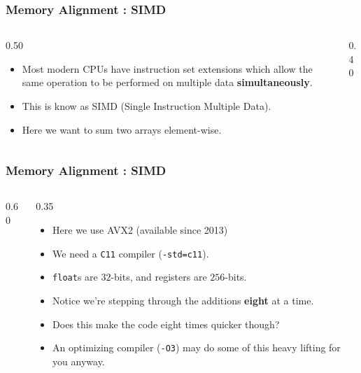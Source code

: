 
\begin{frame}[fragile]
\frametitle{Memory Alignment : SIMD}
\begin{columns}[T]


\pause
\begin{column}{0.50\textwidth}
\begin{itemize}[<+->]
\item Most modern CPUs have instruction set extensions which allow the same operation to be performed on multiple data {\bf simultaneously}.
\item This is know as SIMD (Single Instruction Multiple Data).
\item Here we want to sum two arrays element-wise.
\end{itemize}
\end{column}

\pause
\begin{column}{0.40\textwidth}

\end{column}

\end{columns}
\end{frame}


\begin{frame}[fragile]
\frametitle{Memory Alignment : SIMD}
\begin{columns}[T]

\begin{column}{0.60\textwidth}

\end{column}

\pause
\begin{column}{0.35\textwidth}
\begin{itemize}[<+->]
\item Here we use AVX2 (available since 2013)
\item We need a \verb^C11^ compiler (\verb^-std=c11^).
\item \verb^float^s are $32$-bits, and registers are $256$-bits.
\item Notice we're stepping through the additions {\bf eight} at a time.
\item Does this make the code eight times quicker though?
\item An optimizing compiler (\verb^-O3^) may do some of this heavy lifting for you anyway.
\end{itemize}
\end{column}

\end{columns}
\end{frame}

